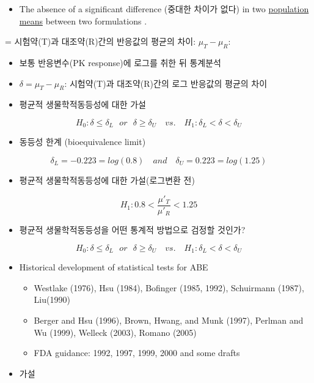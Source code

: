 \documentclass[
]{book}
\providecommand{\tightlist}{%
  \setlength{\itemsep}{0pt}\setlength{\parskip}{0pt}}
\begin{document}
\begin{itemize}
\tightlist
\item
  The absence of a significant difference (중대한 차이가 없다) in two \underline{population
  means} between two formulations .
\end{itemize}

= 시험약(T)과 대조약(R)간의 반응값의 평균의 차이: \(\mu_T-\mu_R\):

\begin{itemize}
\item
  보통 반응변수(PK response)에 로그를 취한 뒤 통계분석
\item
  \(\delta=\mu_T-\mu_R\): 시험약(T)과 대조약(R)간의 로그 반응값의 평균의 차이
\item
  평균적 생물학적동등성에 대한 가설
\end{itemize}

\[ H_0: \delta \le \delta_L ~~~or~~~ \delta \ge \delta_U   \quad vs. \quad H_1: \delta_L < \delta < \delta_U \]

\begin{itemize}
\tightlist
\item
  동등성 한계 (bioequivalence limit)
\end{itemize}

\[ \delta_L=-0.223=log(0.8) \quad and \quad \delta_U=0.223=log(1.25) \]

\begin{itemize}
\tightlist
\item
  평균적 생물학적동등성에 대한 가설(로그변환 전)
\end{itemize}

\[ H_1: 0.8 < \frac{\mu'_T}{\mu'_R} < 1.25 \]

\begin{itemize}
\tightlist
\item
  평균적 생물학적동등성을 어떤 통계적 방법으로 검정할 것인가?
\end{itemize}

\[ H_0: \delta \le \delta_L ~~~or~~~ \delta \ge \delta_U   \quad vs. \quad H_1: \delta_L < \delta < \delta_U \]

\begin{itemize}
\item
  Historical development of statistical tests for ABE

  \begin{itemize}
  \item
    Westlake (1976), Hsu (1984), Bofinger (1985, 1992), Schuirmann (1987), Liu(1990)
  \item
    Berger and Hsu (1996), Brown, Hwang, and Munk (1997), Perlman and Wu (1999), Welleck (2003), Romano (2005)
  \item
    FDA guidance: 1992, 1997, 1999, 2000 and some drafts
  \end{itemize}
\item
  가설
\end{itemize}
\end{document}
